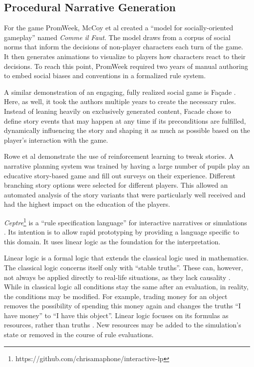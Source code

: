 \subsection{Procedural Narrative Generation}

For the game PromWeek, McCoy et al \cite{mccoy_2013, McCoy:2011:CIF:3014589.3014617} created a \enquote{model for socially-oriented gameplay} named \emph{Comme il Faut}.
The model draws from a corpus of social norms that inform the decisions of non-player characters each turn of the game.
It then generates animations to visualize to players how characters react to their decisions.
To reach this point, PromWeek required two years of manual authoring to embed social biases and conventions in a formalized rule system.

A similar demonstration of an engaging, fully realized social game is Fa\c{c}ade \cite{Mateas_2003}.
Here, as well, it took the authors multiple years to create the necessary rules.
Instead of leaning heavily on exclusively generated content, Facade chose to define story events that may happen at any time if its preconditions are fulfilled, dynamically influencing the story and shaping it as much as possible based on the player's interaction with the game.

Rowe et al \cite{rowe_2014} demonstrate the use of reinforcement learning to tweak stories.
A narrative planning system was trained by having a large number of pupils play an educative story-based game and fill out surveys on their experience.
Different branching story options were selected for different players.
This allowed an automated analysis of the story variants that were particularly well received and had the highest impact on the education of the players.

\emph{Ceptre}\footnote{https://github.com/chrisamaphone/interactive-lp} is a \enquote{rule specification language} for interactive narratives or simulations \cite{martens_2015}.
Its intention is to allow rapid prototyping by providing a language specific to this domain.
It uses linear logic as the foundation for the interpretation.

Linear logic is a formal logic that extends the classical logic used in mathematics.
The classical logic concerns itself only with \enquote{stable truths}.
These can, however, not always be applied directly to real-life situations, as they lack causality \cite{girard_1995}.
While in classical logic all conditions stay the same after an evaluation, in reality, the conditions may be modified.
For example, trading money for an object removes the possibility of spending this money again and changes the truths \enquote{I have money} to \enquote{I have this object}.
Linear logic focuses on its formulas as resources, rather than truths \cite{sep-logic-linear}.
New resources may be added to the simulation's state or removed in the course of rule evaluations.

